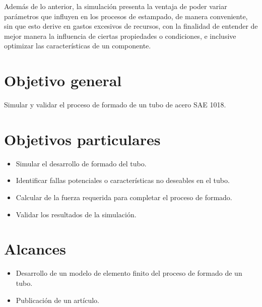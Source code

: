 Además de lo anterior, la simulación presenta la ventaja de poder variar parámetros que influyen en los procesos de 
estampado, de manera conveniente, sin que esto derive en gastos excesivos de recursos, con la finalidad de entender 
de mejor manera la influencia de ciertas propiedades o condiciones, e inclusive optimizar las características 
de un componente.



\section{Objetivo general}

Simular y validar el proceso de formado de un tubo de acero SAE 1018.

\section{Objetivos particulares}
\begin{itemize}
\item Simular el desarrollo de formado del tubo.
\item Identificar fallas potenciales o características no deseables en el tubo.
\item Calcular de la fuerza requerida para completar el proceso de formado.
\item Validar los resultados de la simulación.
\end{itemize}


\section{Alcances}


\begin{itemize}
\item Desarrollo de un modelo de elemento finito del proceso de formado de un tubo.
\item Publicación de un artículo.
\end{itemize}


